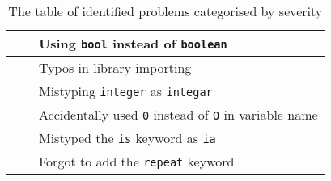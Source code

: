 \begin{table}[!h]
\begin{tabular}{| p{5cm} | p{5cm} | p{5cm} |}
                                                           &                                                                    & Using \lstinline!bool! instead of \lstinline!boolean!                                                    \\ \hline
                                                           &                                                                    & Typos in library importing                                                                               \\ \hline
                                                           &                                                                    & Mistyping \lstinline!integer! as \lstinline!integar!                                                     \\ \hline
                                                           &                                                                    & Accidentally used \lstinline!0! instead of \lstinline!O! in variable name                                \\ \hline
                                                           &                                                                    & Mistyped the \lstinline!is! keyword as \lstinline!ia!                                                    \\ \hline
                                                           &                                                                    & Forgot to add the \lstinline!repeat! keyword                                                             \\ \hline
\end{tabular}
\caption{The table of identified problems categorised by severity}
\end{table}

